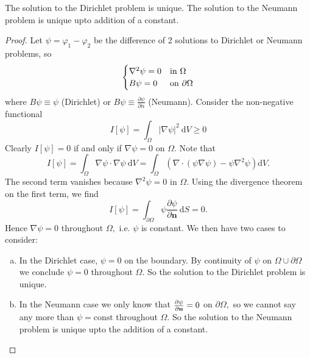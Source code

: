 \begin{proposition}
    The solution to the Dirichlet problem is unique. The solution to the Neumann problem is unique upto addition of a constant.
\end{proposition}
\begin{proof}
    Let $ \psi=\varphi_1-\varphi_2 $ be the difference of 2 solutions to Dirichlet or Neumann problems, so 
    \[
    \begin{cases}
        \laplacian \psi=0 & \text {in } \Omega \\
        B \psi=0 & \text {on } \partial \Omega
    \end{cases} 
    \]
    where $B \psi \equiv \psi$ (Dirichlet) or $B \psi \equiv \frac{\partial \psi}{\partial n}$ (Neumann). Consider the non-negative functional
    \[
        I[\psi]=\int_{\Omega}|\nabla \psi|^{2} \mathrm{~d} V \ge 0
    \]
    Clearly $I[\psi]=0$ if and only if $\nabla \psi=0$ on $\Omega$. Note that
    \[
        I[\psi]=\int_{\Omega} \nabla \psi \cdot \nabla \psi \mathrm{~d} V=\int_{\Omega}\left(\nabla \cdot(\psi \nabla \psi)-\psi \nabla^{2} \psi\right) \mathrm{d} V.
    \]
    The second term vanishes because $\nabla^{2} \psi=0$ in $\Omega$. Using the divergence theorem on the first term, we find
    \[
        I[\psi]=\int_{\partial \Omega} \psi \frac{\partial \psi}{\partial \mathbf{n}} \mathrm{~d} S=0.
    \]
    Hence $\nabla \psi=0$ throughout $\Omega,$ i.e. $\psi$ is constant. We then have two cases to consider:
    \begin{enumerate}[(a)]
        \item In the Dirichlet case, $\psi=0$ on the boundary. By continuity of $\psi$ on $\Omega \cup \partial \Omega$ we conclude $\psi=0$ throughout $\Omega$. So the solution to the Dirichlet problem is unique.
        \item In the Neumann case we only know that $\frac{\partial \psi}{\partial {\bf n}}=0$ on $\partial \Omega,$ so we cannot say any more than $\psi=\text{const}$ throughout $\Omega$. So the solution to the Neumann problem is unique upto the addition of a constant.\qedhere
    \end{enumerate}
\end{proof}

